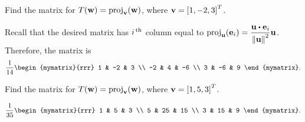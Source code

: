 \begin{ex}
  Find the matrix for
  $T(\vect{w}) = \proj_{\vect{v}}(\vect{w})$, where
  $\vect{v}=\mat{1, -2, 3}^T$.
  \begin{sol}
    Recall that the desired matrix has $i^{\,\rm th}$ column equal to
    $\displaystyle\proj_{\vect{u}}(\vect{e}_i) =
    \frac{\vect{u}\dotprod\vect{e}_i}{\norm{\vect{u}}^2}\vect{u}$.
    Therefore, the matrix is
    \begin{equation*}
      \frac{1}{14}\begin{mymatrix}{rrr}
        1 & -2 & 3 \\
        -2 & 4 & -6 \\
        3 & -6 & 9
      \end{mymatrix}.
    \end{equation*}
  \end{sol}
\end{ex}

\begin{ex}
  Find the matrix for
  $T(\vect{w}) = \proj_{\vect{v}}(\vect{w})$, where
  $\vect{v}=\mat{1,5,3}^T$.
  \begin{sol}
    \begin{equation*}
      \frac{1}{35}\begin{mymatrix}{rrr}
        1 & 5 & 3 \\
        5 & 25 & 15 \\
        3 & 15 & 9
      \end{mymatrix}.
    \end{equation*}
  \end{sol}
\end{ex}

